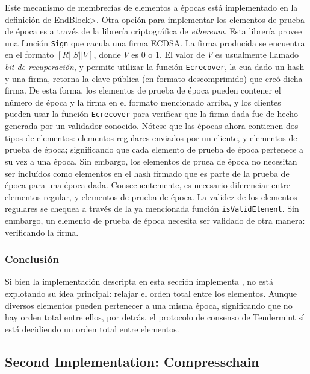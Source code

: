 %
Este mecanismo de membrecías de elementos a épocas está implementado en la definición de
\<EndBlock>.
%
Otra opción para implementar los elementos de prueba de época es a través de la librería
criptográfica de \textit{ethereum}.
%
Esta librería provee una función \texttt{Sign} que cacula una firma ECDSA.
%
La firma producida se encuentra en el formato $[R || S || V]$, donde $V$ es 0 o 1.
%
El valor de $V$ es usualmente llamado \textit{bit de recuperación}, y permite utilizar
la función \texttt{Ecrecover}, la cua dado un hash y una firma, retorna la clave pública
(en formato descomprimido) que creó dicha firma.
%
De esta forma, los elementos de prueba de época pueden contener el número de época y la firma
en el formato mencionado arriba, y los clientes pueden usar la función \texttt{Ecrecover} para
verificar que la firma dada fue de hecho generada por un validador conocido.
%
Nótese que las épocas ahora contienen dos tipos de elementos: elementos regulares enviados por
un cliente, y elementos de prueba de época; significando que cada elemento de prueba de época
pertenece a su vez a una época. Sin embargo, los elementos de pruea de época no necesitan ser
incluídos como elementos en el hash firmado que es parte de la prueba de época para una época
dada.
%
Consecuentemente, es necesario diferenciar entre elementos regular, y elementos de prueba de época.
%
La validez de los elementos regulares se chequea a través de la ya mencionada función
\texttt{isValidElement}.
%
Sin enmbargo, un elemento de prueba de época necesita ser validado de otra manera: verificando la firma.
%

\subsubsection{Conclusión}
Si bien la implementación descripta en esta sección implementa \setchain, no está explotando su idea
principal: relajar el orden total entre los elementos.
%
Aunque diversos elementos pueden pertenecer a una misma época, significando que no hay orden total
entre ellos, por detrás, el protocolo de consenso de Tendermint sí está decidiendo un orden total
entre elementos.
%
%



\subsection{Second Implementation: Compresschain}\label{subsec:compresschain}

